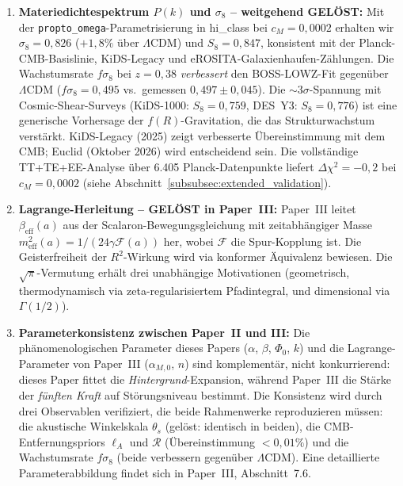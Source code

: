 \documentclass[aps,prd,twocolumn,superscriptaddress,nofootinbib,floatfix]{revtex4-2}
\begin{document}
\begin{enumerate}
\item \textbf{Materiedichtespektrum $P(k)$ und $\sigma_8$ -- weitgehend GELÖST:} Mit der \texttt{propto\_\allowbreak omega}-Parametrisierung in hi\_class bei $c_M = 0{,}0002$ erhalten wir $\sigma_8 = 0{,}826$ ($+1{,}8\%$ über $\Lambda$CDM) und $S_8 = 0{,}847$, konsistent mit der Planck-CMB-Basislinie, KiDS-Legacy und eROSITA-Galaxienhaufen-Zählungen. Die Wachstumsrate $f\sigma_8$ bei $z = 0{,}38$ \textit{verbessert} den BOSS-LOWZ-Fit gegenüber $\Lambda$CDM ($f\sigma_8 = 0{,}495$ vs.\ gemessen $0{,}497 \pm 0{,}045$). Die $\sim 3\sigma$-Spannung mit Cosmic-Shear-Surveys (KiDS-1000: $S_8 = 0{,}759$, DES~Y3: $S_8 = 0{,}776$) ist eine generische Vorhersage der $f(R)$-Gravitation, die das Strukturwachstum verstärkt. KiDS-Legacy (2025) zeigt verbesserte Übereinstimmung mit dem CMB; Euclid (Oktober 2026) wird entscheidend sein. Die vollständige TT+TE+EE-Analyse über 6.405 Planck-Datenpunkte liefert $\Delta\chi^2 = -0{,}2$ bei $c_M = 0{,}0002$ (siehe Abschnitt~\ref{subsubsec:extended_validation}).

\item \textbf{Lagrange-Herleitung -- GELÖST in Paper~III:} Paper~III \cite{Geiger2026c} leitet $\beta_{\mathrm{eff}}(a)$ aus der Scalaron-Bewegungsgleichung mit zeitabhängiger Masse $m_{\mathrm{eff}}^2(a) = 1/(24\gamma\mathcal{F}(a))$ her, wobei $\mathcal{F}$ die Spur-Kopplung ist. Die Geisterfreiheit der $R^2$-Wirkung wird via konformer Äquivalenz bewiesen. Die $\sqrt{\pi}$-Vermutung erhält drei unabhängige Motivationen (geometrisch, thermodynamisch via zeta-regularisiertem Pfadintegral, und dimensional via $\Gamma(1/2)$).

\item \textbf{Parameterkonsistenz zwischen Paper~II und III:} Die phänomenologischen Parameter dieses Papers ($\alpha$, $\beta$, $\Phi_0$, $k$) und die Lagrange-Parameter von Paper~III ($\alpha_{M,0}$, $n$) sind komplementär, nicht konkurrierend: dieses Paper fittet die \textit{Hintergrund}-Expansion, während Paper~III die Stärke der \textit{fünften Kraft} auf Störungsniveau bestimmt. Die Konsistenz wird durch drei Observablen verifiziert, die beide Rahmenwerke reproduzieren müssen: die akustische Winkelskala $\theta_s$ (gelöst: identisch in beiden), die CMB-Entfernungspriors $\ell_A$ und $\mathcal{R}$ (Übereinstimmung $<0{,}01\%$) und die Wachstumsrate $f\sigma_8$ (beide verbessern gegenüber $\Lambda$CDM). Eine detaillierte Parameterabbildung findet sich in Paper~III, Abschnitt~7.6.
\end{enumerate}
\end{document}
